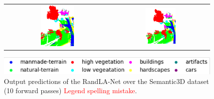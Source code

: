 \begin{figure}[h!]
\begin{tabular}{cc}
            \includegraphics[width=0.33\textwidth, height=0.18\textheight]{images/ood_imgs/fout_sem3d/fout_3.png}&
            \includegraphics[width=0.33\textwidth, height=0.18\textheight]{images/sem3d_of/fout_sem3d_of_3.png}\\
        \end{tabular}
        \includegraphics[scale=0.65]{images/legend.png}
        \caption{Output predictions of the RandLA-Net over the Semantic3D dataset (10 forward passes) \textcolor{red}{Legend spelling mistake}.}
        \label{fig:flipout_vis_sem3d_OF}
    \end{figure}   
    \FloatBarrier


